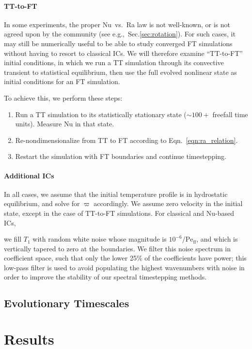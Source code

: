 \documentclass[aps, pre, onecolumn, nofootinbib, notitlepage, groupedaddress, amsfonts, amssymb, amsmath, longbibliography, superscriptaddress]{revtex4-1}
\newcommand{\Peff}{\ensuremath{\text{Pe}_{\text{ff}}}}
\newcommand{\ea}[1]{{\color{red} #1}}
\begin{document}
{\paragraph{TT-to-FT}
In some experiments, the proper Nu~vs.~Ra law is not well-known, or is not agreed upon by the community (see e.g.,~Sec.\ref{sec:rotation}).
For such cases, it may still be numerically useful to be able to study converged FT simulations without having to resort to classical ICs.
We will therefore examine ``TT-to-FT'' initial conditions, in which we run a TT simulation through its convective transient to statistical equilibrium, then use the full evolved nonlinear state as initial conditions for an FT simulation.
}
To achieve this, we perform these steps:
\begin{enumerate}
\item Run a TT simulation to its statistically stationary state ($\sim100+$ freefall time units). 
Measure $\text{Nu}$ in that state.
\item Re-nondimensionalize from TT to FT according to Eqn.~\ref{eqn:ra_relation}.
\item Restart the simulation with FT boundaries and continue timestepping.
\end{enumerate}

\ea{\paragraph{Additional ICs}
In all cases, we assume that the initial temperature profile is in hydrostatic equilibrium, and solve for $\varpi$ accordingly.
We assume zero velocity in the initial state, except in the case of TT-to-FT simulations.
For classical and Nu-based ICs,
}
we fill $T_1$ with random white noise whose magnitude is $10^{-6}/\Peff$, and which is vertically tapered to zero at the boundaries.
We filter this noise spectrum in coefficient space, such that only the lower 25\% of the coefficients have power; this low-pass filter is used to avoid populating the highest wavenumbers with noise in order to improve the stability of our spectral timestepping methods.

\ea{
\subsection{Evolutionary Timescales}

}

\section{Results}
\label{sec:2d_results}
\end{document}
